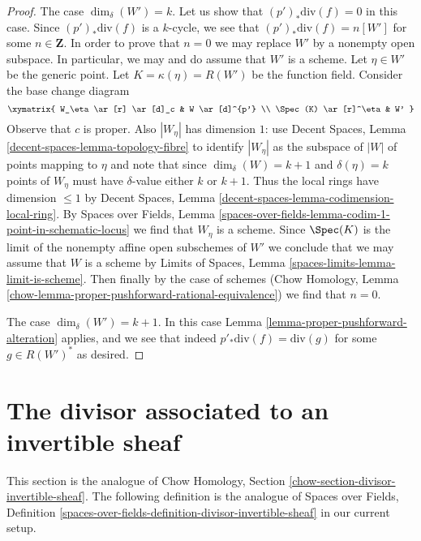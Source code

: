 \begin{proof}
\medskip\noindent
The case $\dim_\delta(W') = k$. Let us show that $(p')_*\text{div}(f) = 0$
in this case. Since $(p')_*\text{div}(f)$ is a $k$-cycle, we see
that $(p')_*\text{div}(f) = n[W']$ for some $n \in \mathbf{Z}$.
In order to prove that $n = 0$ we may replace $W'$ by
a nonempty open subspace. In particular, we may and
do assume that $W'$ is a scheme. Let $\eta \in W'$ be the generic point.
Let $K = \kappa(\eta) = R(W')$ be the function field.
Consider the base change diagram
$$
\xymatrix{
W_\eta \ar[r] \ar[d]_c & W \ar[d]^{p'} \\
\Spec(K) \ar[r]^\eta & W'
}
$$
Observe that $c$ is proper. Also $|W_\eta|$ has dimension $1$:
use Decent Spaces, Lemma \ref{decent-spaces-lemma-topology-fibre}
to identify $|W_\eta|$ as the subspace of $|W|$ of points mapping to $\eta$
and note that since $\dim_\delta(W) = k + 1$ and $\delta(\eta) = k$
points of $W_\eta$ must have $\delta$-value either $k$ or $k + 1$.
Thus the local rings have dimension $\leq 1$ by
Decent Spaces, Lemma \ref{decent-spaces-lemma-codimension-local-ring}.
By Spaces over Fields, Lemma
\ref{spaces-over-fields-lemma-codim-1-point-in-schematic-locus}
we find that $W_\eta$ is a scheme.
Since $\Spec(K)$ is the limit of the nonempty affine open subschemes of $W'$
we conclude that we may assume that $W$ is a scheme by
Limits of Spaces, Lemma \ref{spaces-limits-lemma-limit-is-scheme}.
Then finally by the case of schemes
(Chow Homology, Lemma \ref{chow-lemma-proper-pushforward-rational-equivalence})
we find that $n = 0$.

\medskip\noindent
The case $\dim_\delta(W') = k + 1$. In this case
Lemma \ref{lemma-proper-pushforward-alteration} applies,
and we see that indeed $p'_*\text{div}(f) = \text{div}(g)$
for some $g \in R(W')^*$ as desired.
\end{proof}












\section{The divisor associated to an invertible sheaf}
\label{section-divisor-invertible-sheaf}

\noindent
This section is the analogue of
Chow Homology, Section \ref{chow-section-divisor-invertible-sheaf}.
The following definition is the analogue of
Spaces over Fields, Definition
\ref{spaces-over-fields-definition-divisor-invertible-sheaf}
in our current setup.

